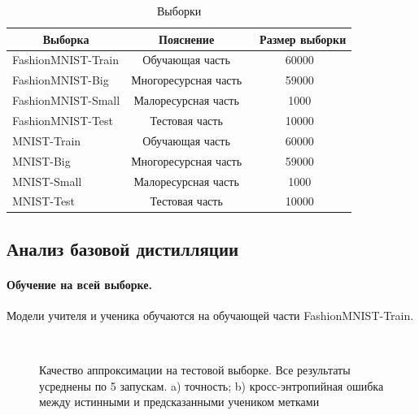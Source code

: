 \begin{table}[h!t]
\begin{center}
\caption{Выборки}
\label{table_2}
\begin{tabular}{|c|c|c|}
\hline
	Выборка & Пояснение &\ Размер выборки\\
	\hline
	\multicolumn{1}{|l|}{FashionMNIST-Train}
	& Обучающая часть& 60000\\
	\hline
	\multicolumn{1}{|l|}{FashionMNIST-Big}
	& Многоресурсная часть& 59000\\
	\hline
	\multicolumn{1}{|l|}{FashionMNIST-Small}
	& Малоресурсная часть& 1000\\
	\hline
	\multicolumn{1}{|l|}{FashionMNIST-Test}
	& Тестовая часть& 10000\\
	\hline
	\multicolumn{1}{|l|}{MNIST-Train}
	& Обучающая часть& 60000\\
	\hline
	\multicolumn{1}{|l|}{MNIST-Big}
	& Многоресурсная часть& 59000\\
	\hline
	\multicolumn{1}{|l|}{MNIST-Small}
	& Малоресурсная часть& 1000\\
	\hline
	\multicolumn{1}{|l|}{MNIST-Test}
	& Тестовая часть& 10000\\
\hline

\end{tabular}
\end{center}
\end{table}

\newpage
\subsection{Анализ базовой дистилляции}

\paragraph{Обучение на всей выборке.}
Модели учителя и ученика обучаются на обучающей части FashionMNIST-Train.

\begin{figure}[h!t]\center
{}
\\
\caption{Качество аппроксимации на тестовой выборке. Все результаты усреднены по 5 запускам. a) точность; b) кросс-энтропийная ошибка между истинными и предсказанными учеником метками}
\end{figure}

